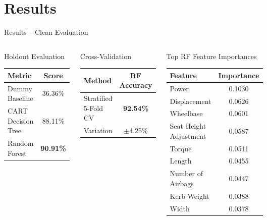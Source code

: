 \documentclass[aspectratio=169]{beamer}
\begin{document}
\section{Results}
\begin{frame}{Results -- Clean Evaluation}
  \begin{columns}[t]
      \begin{block}{Holdout Evaluation}
        \vspace{0.3em}
        \begin{tabular}{lc}
          \toprule
          \textbf{Metric} & \textbf{Score} \\
          \midrule
          Dummy Baseline & 36.36\% \\
          CART Decision Tree & 88.11\% \\
          Random Forest & \textbf{90.91\%} \\
          \bottomrule
        \end{tabular}
      \end{block}
      \vspace{0.5em}
      \begin{block}{Cross-Validation}
        \vspace{0.3em}
        \begin{tabular}{lc}
          \toprule
          \textbf{Method} & \textbf{RF Accuracy} \\
          \midrule
          Stratified 5-Fold CV & \textbf{92.54\%} \\
          Variation & $\pm$4.25\% \\
          \bottomrule
        \end{tabular}
      \end{block}

      \begin{block}{Top RF Feature Importances}
        \vspace{0.3em}
        \begin{tabular}{lc}
          \toprule
          \textbf{Feature} & \textbf{Importance} \\
          \midrule
          Power & 0.1030 \\
          Displacement & 0.0626 \\
          Wheelbase & 0.0601 \\
          Seat Height Adjustment & 0.0587 \\
          Torque & 0.0511 \\
          Length & 0.0455 \\
          Number of Airbags & 0.0447 \\
          Kerb Weight & 0.0388 \\
          Width & 0.0378 \\
          \bottomrule
        \end{tabular}
      \end{block}
      \vspace{0.4em}
  \end{columns}
\end{frame}
\end{document}
